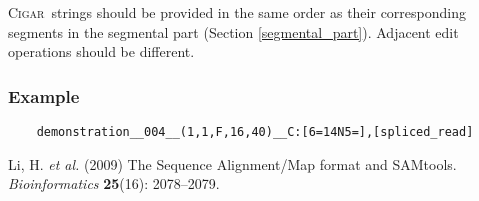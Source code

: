 \documentclass[10pt,a4paper]{article}
\newcommand{\CIGAR}{\textsc{Cigar}}
\begin{document}
\medskip

\CIGAR\ strings should be provided in the same order as their corresponding segments in the {segmental part} (Section \ref{segmental_part}). Adjacent edit operations should be different.

\subsubsection*{Example}

\begin{framed}\small
\begin{verbatim}
	demonstration__004__(1,1,F,16,40)__C:[6=14N5=],[spliced_read]
\end{verbatim}
\end{framed}





\begin{thebibliography}{}
	Li, H. \textit{et al.} (2009)
	The Sequence Alignment/Map format and SAMtools.
	\textit{Bioinformatics} \textbf{25}(16): 2078--2079.
\end{thebibliography}
\end{document}

